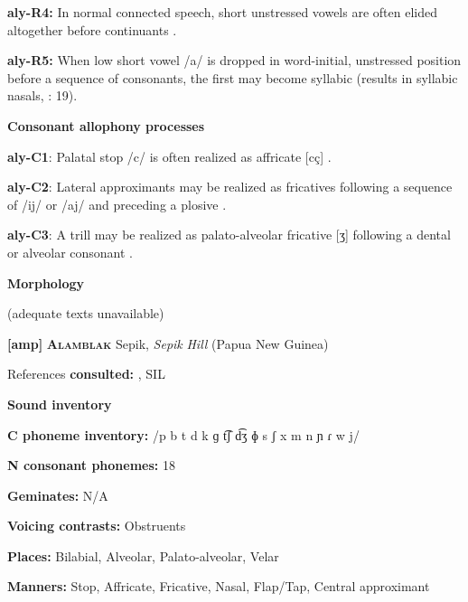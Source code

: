 \textbf{aly-R4:} In normal connected speech, short unstressed vowels are often elided altogether before continuants \citep[27]{Yallop1977}.



\textbf{aly-R5:} When low short vowel /a/ is dropped in word-initial, unstressed position before a sequence of consonants, the first may become syllabic (results in syllabic nasals, \citealt{Yallop1977}: 19).



\textbf{Consonant allophony processes}



\textbf{aly-C1}: Palatal stop /c/ is often realized as affricate [cç] \citep[21]{Yallop1977}.



\textbf{aly-C2}: Lateral approximants may be realized as fricatives following a sequence of /ij/ or /aj/ and preceding a plosive \citep[19]{Yallop1977}.



\textbf{aly-C3}: A trill may be realized as palato-alveolar fricative [ʒ] following a dental or alveolar consonant \citep[19]{Yallop1977}.



\textbf{Morphology}



(adequate texts unavailable)



\textbf{[amp]}   \textbf{\textsc{Alamblak}}  Sepik, \textit{Sepik} \textit{Hill} (Papua New Guinea)



References \textbf{consulted:} \citet{Bruce1984}, SIL 



\textbf{Sound inventory}



\textbf{C phoneme inventory:} /p b t d k ɡ t͡ʃ d͡ʒ ɸ s ʃ x m n ɲ ɾ w j/



\textbf{N consonant phonemes:} 18



\textbf{Geminates:} N/A



\textbf{Voicing contrasts:} Obstruents



\textbf{Places:} Bilabial, Alveolar, Palato-alveolar, Velar



\textbf{Manners:} Stop, Affricate, Fricative, Nasal, Flap/Tap, Central approximant



